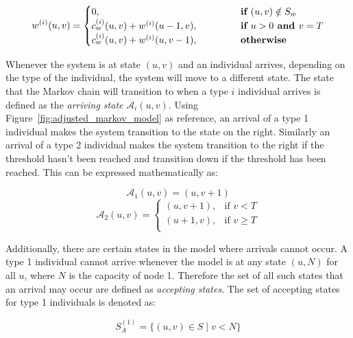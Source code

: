 \begin{equation} \label{eq:recursive_waiting_time_for_state}
    w^{(i)}(u,v) =
    \begin{cases}
        0, \hspace{4.85cm} & \textbf{if } (u,v) \notin S_w \\
        c^{(i)}_w(u,v) + w^{(i)}(u-1, v), & \textbf{if } u > 0 \textbf{ and } v = T \\
        c^{(i)}_w(u,v) + w^{(i)}(u, v-1), & \textbf{otherwise}
    \end{cases}
\end{equation}

Whenever the system is at state \((u,v)\) and an individual arrives, depending
on the type of the individual, the system will move to a different state.
The state that the Markov chain will transition to when a type \(i\) individual
arrives is defined as the \textit{arriving state} \(\mathcal{A}_i(u,v)\).
Using Figure~\ref{fig:adjusted_markov_model} as reference, an arrival of a type
1 individual makes the system transition to the state on the right.
Similarly an arrival of a type 2 individual makes the system transition to the
right if the threshold hasn't been reached and transition down if the threshold
has been reached.
This can be expressed mathematically as:

\begin{equation}\label{eq:arriving_state_type_1}
    \mathcal{A}_1(u,v) = (u, v + 1)
\end{equation}
\begin{equation}\label{eq:arriving_state_type_2}
    \mathcal{A}_2(u,v) =
    \begin{cases}
        (u, v + 1), & \text{if } v < T \\
        (u + 1, v), & \text{if } v \geq T \\
    \end{cases}
\end{equation}

Additionally, there are certain states in the model where arrivals cannot occur.
A type 1 individual cannot arrive whenever the model is at any state \((u, N)\)
for all \(u\), where \(N\) is the capacity of node 1.
Therefore the set of all such states that an arrival may occur are defined as
\textit{accepting states}.
The set of accepting states for type 1 individuals is denoted as:

\begin{equation}\label{eq:accepting_states_type_1}
    S_A^{(1)} = \{(u, v) \in S \; | \; v < N \}
\end{equation}

